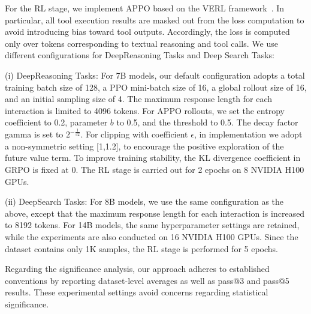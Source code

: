 \documentclass{llmxive}
\providecommand{\arraystretch}{1.1}
\begin{document}
For the RL stage, we implement APPO based on the VERL framework~\cite{sheng2025hybridflow}. In particular, all tool execution results are masked out from the loss computation to avoid introducing bias toward tool outputs. Accordingly, the loss is computed only over tokens corresponding to textual reasoning and tool calls. We use different configurations for DeepReasoning Tasks and Deep Search Tasks:

(i) DeepReasoning Tasks: For 7B models,  our default configuration adopts a total training batch size of 128, a PPO mini-batch size of 16, a global rollout size of 16, and an initial sampling size of 4. The maximum response length for each interaction is limited to 4096 tokens. For APPO rollouts, we set the entropy coefficient to 0.2, parameter $b$ to 0.5, and the threshold to 0.5. The decay factor gamma is set to $2^{-\frac{1}{32}}$. For clipping with coefficient $\epsilon$, in implementation we adopt a non-symmetric setting  [1,1.2], to encourage the positive exploration of the future value term.  To improve training stability, the KL divergence coefficient in GRPO is fixed at 0. The RL stage is carried out for 2 epochs on 8 NVIDIA H100 GPUs.

(ii) DeepSearch Tasks: For 8B models, we use the same configuration as the above, except that the maximum response length for each interaction is increased to 8192 tokens. For 14B models, the same hyperparameter settings are retained, while the experiments are also conducted on 16 NVIDIA H100 GPUs. Since the dataset contains only 1K samples, the RL stage is performed for 5 epochs.

Regarding the significance analysis, our approach adheres to established conventions by reporting dataset-level averages as well as pass@3 and pass@5 results. These experimental settings avoid concerns regarding statistical significance.



\begin{table}[t]
\centering
\label{tab:appx} 
\renewcommand{\arraystretch}{1.1}   
\setlength\tabcolsep{6pt} 
\vspace{-0.4cm}
\caption{Analysis on branching configuration with Qwen2.5-7B-Instruct. The best results are in \textbf{bold}.}
\end{table}	 	 
 
\end{document}
